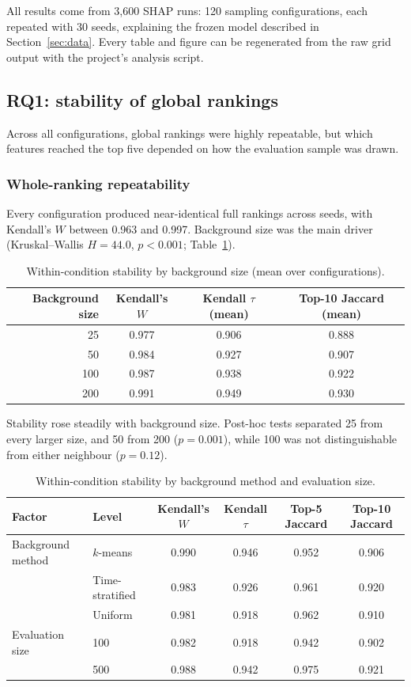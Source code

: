 \documentclass[11pt,a4paper]{article}
\begin{document}
All results come from 3{,}600 SHAP runs: 120 sampling configurations, each repeated with 30 seeds, explaining the frozen model described in Section~\ref{sec:data}. Every table and figure can be regenerated from the raw grid output with the project's analysis script.

\subsection{RQ1: stability of global rankings}\label{sec:rq1}

Across all configurations, global rankings were highly repeatable, but which features reached the top five depended on how the evaluation sample was drawn.

\subsubsection{Whole-ranking repeatability}

Every configuration produced near-identical full rankings across seeds, with Kendall's $W$ between 0.963 and 0.997. Background size was the main driver (Kruskal--Wallis $H = 44.0$, $p < 0.001$; Table~\ref{tab:bgsize}).

\begin{table}[htbp]
\centering\small
\caption{Within-condition stability by background size (mean over configurations).}
\label{tab:bgsize}
\begin{tabular}{rccc}
\toprule
Background size & Kendall's $W$ & Kendall $\tau$ (mean) & Top-10 Jaccard (mean) \\
\midrule
25 & 0.977 & 0.906 & 0.888 \\
50 & 0.984 & 0.927 & 0.907 \\
100 & 0.987 & 0.938 & 0.922 \\
200 & 0.991 & 0.949 & 0.930 \\
\bottomrule
\end{tabular}
\end{table}

Stability rose steadily with background size. Post-hoc tests separated 25 from every larger size, and 50 from 200 ($p = 0.001$), while 100 was not distinguishable from either neighbour ($p = 0.12$).

\begin{table}[htbp]
\centering\small
\caption{Within-condition stability by background method and evaluation size.}
\label{tab:bgmethod}
\begin{tabular}{llcccc}
\toprule
Factor & Level & Kendall's $W$ & Kendall $\tau$ & Top-5 Jaccard & Top-10 Jaccard \\
\midrule
Background method & $k$-means & 0.990 & 0.946 & 0.952 & 0.906 \\
 & Time-stratified & 0.983 & 0.926 & 0.961 & 0.920 \\
 & Uniform & 0.981 & 0.918 & 0.962 & 0.910 \\
\midrule
Evaluation size & 100 & 0.982 & 0.918 & 0.942 & 0.902 \\
 & 500 & 0.988 & 0.942 & 0.975 & 0.921 \\
\bottomrule
\end{tabular}
\end{table}
\end{document}
